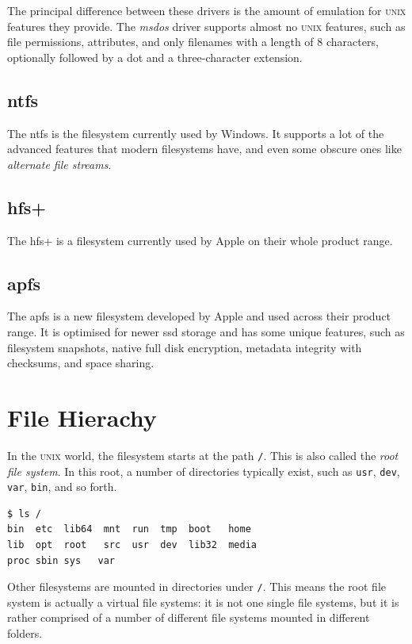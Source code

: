 \documentclass[a4paper]{article}
\begin{document}
The principal difference between these drivers is the amount of emulation for \textsc{unix} features they provide. The \emph{msdos} driver supports almost no \textsc{unix} features, such as file permissions, attributes, and only filenames with a length of 8 characters, optionally followed by a dot and a three-character extension.

\subsection{\glsdesc*{ntfs}}

The \gls{ntfs} is the filesystem currently used by Windows. It supports a lot of the advanced features that modern filesystems have, and even some obscure ones like \emph{alternate file streams}.

\subsection{\glsdesc*{hfs+}}

The \gls{hfs+} is a filesystem currently used by Apple on their whole product range.

\subsection{\glsdesc*{apfs}}

The \gls{apfs} is a new filesystem developed by Apple and used across their product range. It is optimised for newer \gls{ssd} storage and has some unique features, such as filesystem snapshots, native full disk encryption, metadata integrity with checksums, and space sharing.

\section{File Hierachy}

In the \textsc{unix} world, the filesystem starts at the path \verb|/|. This is also called the \emph{root file system}. In this root, a number of directories typically exist, such as \verb|usr|, \verb|dev|, \verb|var|, \verb|bin|, and so forth.

\begin{verbatim}
$ ls /
bin  etc  lib64  mnt  run  tmp  boot   home 
lib  opt  root   src  usr  dev  lib32  media 
proc sbin sys   var
\end{verbatim}
Other filesystems are mounted in directories under \verb|/|. This means the root file system is actually a virtual file systems: it is not one single file systems, but it is rather comprised of a number of different file systems mounted in different folders. 
\end{document}
